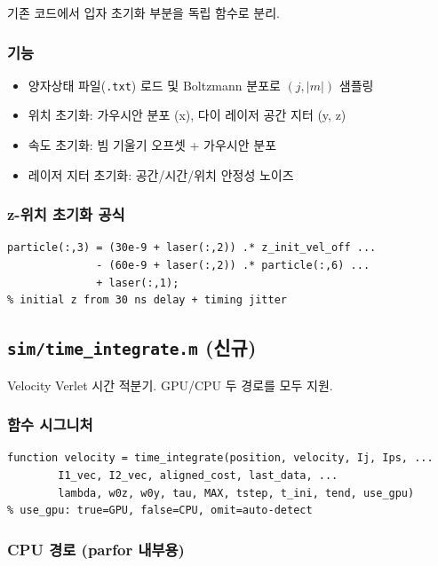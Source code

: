 \documentclass[11pt, a4paper]{article}
\begin{document}
기존 코드에서 입자 초기화 부분을 독립 함수로 분리.

\subsubsection{기능}

\begin{itemize}
  \item 양자상태 파일(\texttt{.txt}) 로드 및 Boltzmann 분포로 $(j, |m|)$ 샘플링
  \item 위치 초기화: 가우시안 분포 (x), 다이 레이저 공간 지터 (y, z)
  \item 속도 초기화: 빔 기울기 오프셋 + 가우시안 분포
  \item 레이저 지터 초기화: 공간/시간/위치 안정성 노이즈
\end{itemize}

\subsubsection{z-위치 초기화 공식}

\begin{lstlisting}
particle(:,3) = (30e-9 + laser(:,2)) .* z_init_vel_off ...
              - (60e-9 + laser(:,2)) .* particle(:,6) ...
              + laser(:,1);
% initial z from 30 ns delay + timing jitter
\end{lstlisting}

\subsection{\texttt{sim/time\_integrate.m} (신규)}

Velocity Verlet 시간 적분기. GPU/CPU 두 경로를 모두 지원.

\subsubsection{함수 시그니처}

\begin{lstlisting}
function velocity = time_integrate(position, velocity, Ij, Ips, ...
        I1_vec, I2_vec, aligned_cost, last_data, ...
        lambda, w0z, w0y, tau, MAX, tstep, t_ini, tend, use_gpu)
% use_gpu: true=GPU, false=CPU, omit=auto-detect
\end{lstlisting}

\subsubsection{CPU 경로 (parfor 내부용)}
\end{document}
